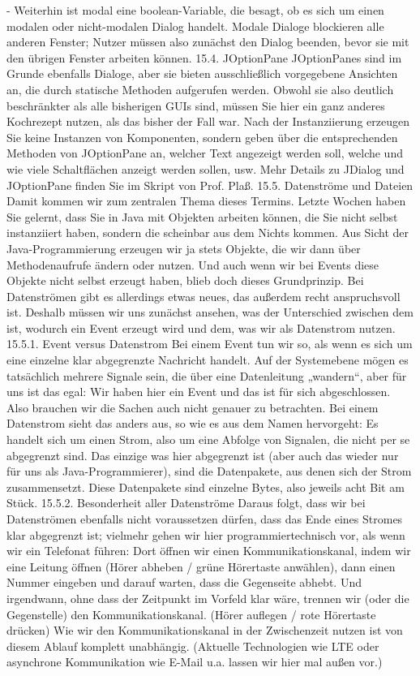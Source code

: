 -	Weiterhin ist modal eine boolean-Variable, die besagt, ob es sich um einen modalen oder nicht-modalen Dialog handelt. Modale Dialoge blockieren alle anderen Fenster; Nutzer müssen also zunächst den Dialog beenden, bevor sie mit den übrigen Fenster arbeiten können.
15.4.	JOptionPane
JOptionPanes sind im Grunde ebenfalls Dialoge, aber sie bieten ausschließlich vorgegebene Ansichten an, die durch statische Methoden aufgerufen werden. Obwohl sie also deutlich beschränkter als alle bisherigen GUIs sind, müssen Sie hier ein ganz anderes Kochrezept nutzen, als das bisher der Fall war. 
Nach der Instanziierung erzeugen Sie keine Instanzen von Komponenten, sondern geben über die entsprechenden Methoden von JOptionPane an, welcher Text angezeigt werden soll, welche und wie viele Schaltflächen anzeigt werden sollen, usw.
Mehr Details zu JDialog und JOptionPane finden Sie im Skript von Prof. Plaß.
15.5.	Datenströme und Dateien
Damit kommen wir zum zentralen Thema dieses Termins. Letzte Wochen haben Sie gelernt, dass Sie in Java mit Objekten arbeiten können, die Sie nicht selbst instanziiert haben, sondern die scheinbar aus dem Nichts kommen.
Aus Sicht der Java-Programmierung erzeugen wir ja stets Objekte, die wir dann über Methodenaufrufe ändern oder nutzen. Und auch wenn wir bei Events diese Objekte nicht selbst erzeugt haben, blieb doch dieses Grundprinzip.
Bei Datenströmen gibt es allerdings etwas neues, das außerdem recht anspruchsvoll ist. Deshalb müssen wir uns zunächst ansehen, was der Unterschied zwischen dem ist, wodurch ein Event erzeugt wird und dem, was wir als Datenstrom nutzen.
15.5.1.	Event versus Datenstrom
Bei einem Event tun wir so, als wenn es sich um eine einzelne klar abgegrenzte Nachricht handelt. Auf der Systemebene mögen es tatsächlich mehrere Signale sein, die über eine Datenleitung „wandern“, aber für uns ist das egal: Wir haben hier ein Event und das ist für sich abgeschlossen. Also brauchen wir die Sachen auch nicht genauer zu betrachten.
Bei einem Datenstrom sieht das anders aus, so wie es aus dem Namen hervorgeht: Es handelt sich um einen Strom, also um eine Abfolge von Signalen, die nicht per se abgegrenzt sind. Das einzige was hier abgegrenzt ist (aber auch das wieder nur für uns als Java-Programmierer), sind die Datenpakete, aus denen sich der Strom zusammensetzt. Diese Datenpakete sind einzelne Bytes, also jeweils acht Bit am Stück.
15.5.2.	Besonderheit aller Datenströme
Daraus folgt, dass wir bei Datenströmen ebenfalls nicht voraussetzen dürfen, dass das Ende eines Stromes klar abgegrenzt ist; vielmehr gehen wir hier programmiertechnisch vor, als wenn wir ein Telefonat führen: Dort öffnen wir einen Kommunikationskanal, indem wir eine Leitung öffnen (Hörer abheben / grüne Hörertaste anwählen), dann einen Nummer eingeben und darauf warten, dass die Gegenseite abhebt. Und irgendwann, ohne dass der Zeitpunkt im Vorfeld klar wäre, trennen wir (oder die Gegenstelle) den Kommunikationskanal. (Hörer auflegen / rote Hörertaste drücken) Wie wir den Kommunikationskanal in der Zwischenzeit nutzen ist von diesem Ablauf komplett unabhängig. (Aktuelle Technologien wie LTE oder asynchrone Kommunikation wie E-Mail u.a. lassen wir hier mal außen vor.)
